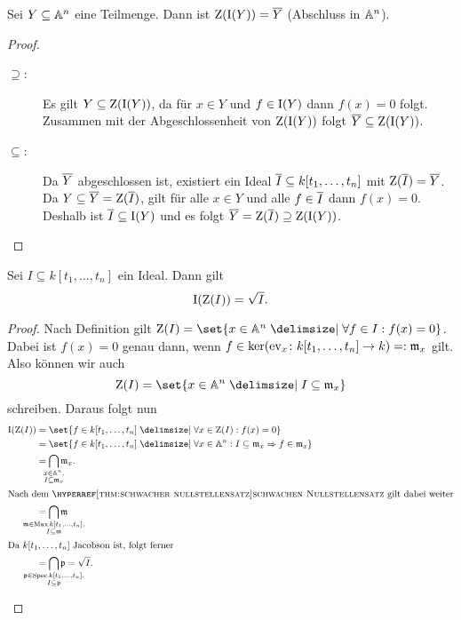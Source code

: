 \documentclass[12pt,a4paper]{scrartcl}
\theoremstyle{cplain}
\theoremstyle{cdef}
\begin{document}
\begin{lem} \label{lem:8.12}
	Sei $Y\subseteq \mathbb A^n$ eine Teilmenge. Dann ist $\operatorname{Z}(\operatorname{I}(Y)) = \overline{Y}$ (Abschluss in $\mathbb A^n$).
\end{lem}
\begin{proof}
	\leavevmode
	\begin{description}
		\item[\glqq$\supseteq$\grqq:] Es gilt $Y\subseteq \operatorname{Z}(\operatorname{I}(Y))$, da für $x\in Y$ und $f\in \operatorname{I}(Y)$ dann $f(x) = 0$ folgt. Zusammen mit der Abgeschlossenheit von $\operatorname{Z}(\operatorname{I}(Y))$ folgt $\overline{Y}\subseteq \operatorname{Z}(\operatorname{I}(Y))$.
		\item[\glqq$\subseteq$\grqq:] Da $\overline{Y}$ abgeschlossen ist, existiert ein Ideal $\overline{I}\subseteq k[t_1,\dots, t_n]$ mit $\operatorname{Z}(\overline{I}) = \overline{Y}$. Da $Y\subseteq \overline{Y} = \operatorname{Z}(\overline{I})$, gilt für alle $x\in Y$ und alle $f\in\overline{I}$ dann $f(x) = 0$. Deshalb ist $\overline{I}\subseteq \operatorname{I}(Y)$ und es folgt $\overline{Y} = \operatorname{Z}(\overline{I}) \supseteq \operatorname{Z}(\operatorname{I}(Y))$.
		\qedhere
	\end{description}
\end{proof}
\begin{satz} \label{thm:hilberts nullstellensatz}
	Sei $I\subseteq k[t_1,\dots, t_n]$ ein Ideal. Dann gilt \[\operatorname{I}(\operatorname{Z}(I)) = \sqrt{I}.\]
\end{satz}

\begin{proof}
	Nach Definition gilt $\Z(I) = \set{x\in\IA^n\given \forall f\in I: f(x) = 0}$. Dabei ist $f(x) = 0$ genau dann, wenn $f\in \operatorname{ker}(\operatorname{ev}_x\colon k[t_1,\dots, t_n]\to k) =: \mathfrak{m}_x$ gilt. Also können wir auch \[\Z(I) = \set{x\in\IA^n\given I\subseteq \fm_x}\] schreiben. Daraus folgt nun
	\begin{align*}
		\I(\Z(I)) &= \set{f\in k[t_1,\dots, t_n]\given \forall x \in \Z(I): f(x) = 0} \\
		&= \set{f\in k[t_1,\dots, t_n] \given \forall x\in\IA^n: I\subseteq \fm_x\Rightarrow f\in \fm_x}\\
		&= \bigcap_{\mathclap{\substack{x\in\IA^n,\\I\subseteq \fm_x}}}\fm_x. \\
	\intertext{Nach dem \hyperreff[thm:schwacher nullstellensatz]{schwachen Nullstellensatz} gilt dabei weiter}
		&= \bigcap_{\mathclap{\substack{\fm\in\Max k[t_1,\dots,t_n],\\I\subseteq \fm}}}\fm \\
	\intertext{Da $k[t_1,\dots, t_n]$ Jacobson ist, folgt ferner}
		&= \bigcap_{\mathclap{\substack{\fp\in\Spec k[t_1,\dots,t_n],\\I\subseteq \fp}}}\fp = \sqrt I.
		\\[-\normalbaselineskip]\tag*{\qedhere}
	\end{align*}
\end{proof}
\end{document}
